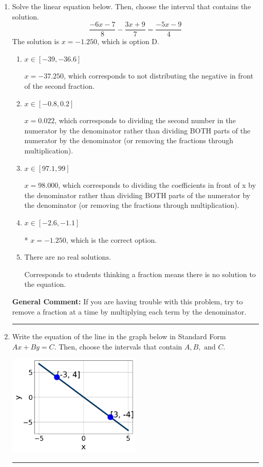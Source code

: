 \documentclass{extbook}[14pt]
\newcommand{\litem}[1]{\item #1

\rule{\textwidth}{0.4pt}}
\begin{document}
\begin{enumerate}\litem{
Solve the linear equation below. Then, choose the interval that contains the solution.
\[ \frac{-6x -7}{8} - \frac{3x + 9}{7} = \frac{-5x -9}{4} \]The solution is \( x = -1.250 \), which is option D.\begin{enumerate}[label=\Alph*.]
\item \( x \in [-39, -36.6] \)

 $x = -37.250$, which corresponds to not distributing the negative in front of the second fraction.
\item \( x \in [-0.8, 0.2] \)

 $x = 0.022$, which corresponds to dividing the second number in the numerator by the denominator rather than dividing BOTH parts of the numerator by the denominator (or removing the fractions through multiplication).
\item \( x \in [97.1, 99] \)

 $x = 98.000$, which corresponds to dividing the coefficients in front of x by the denominator rather than dividing BOTH parts of the numerator by the denominator (or removing the fractions through multiplication).
\item \( x \in [-2.6, -1.1] \)

* $x = -1.250$, which is the correct option.
\item \( \text{There are no real solutions.} \)

Corresponds to students thinking a fraction means there is no solution to the equation.
\end{enumerate}

\textbf{General Comment:} If you are having trouble with this problem, try to remove a fraction at a time by multiplying each term by the denominator.
}
\litem{
Write the equation of the line in the graph below in Standard Form $Ax+By=C$. Then, choose the intervals that contain $A, B, \text{ and } C$.

\begin{center}
    \includegraphics[width=0.5\textwidth]{../Figures/linearGraphToStandardCopyC.png}
\end{center}


}
\end{enumerate}
\end{document}
